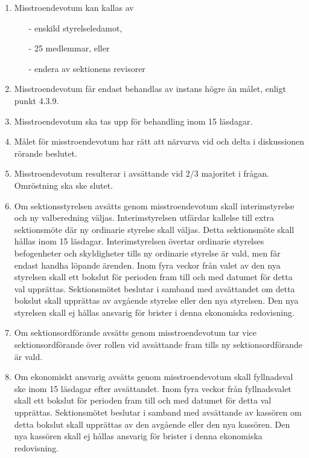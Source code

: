 \documentclass[11pt,a4paper]{article}
\begin{document}
\begin{enumerate}[\thesubsection .1]

   \item Misstroendevotum kan kallas av
		\begin{itemize}
			\item[-] enskild styrelseledamot, 
			\item[-] 25 medlemmar, eller
			\item[-] endera av sektionens revisorer
		\end{itemize}
	
	\item Misstroendevotum får endast behandlas av instans högre än målet, enligt punkt 4.3.9. %
	

	\item Misstroendevotum ska tas upp för behandling inom 15 läsdagar.

	\item Målet för misstroendevotum har rätt att närvarva vid och delta i diskussionen rörande beslutet.

	\item Misstroendevotum resulterar i avsättande vid 2/3 majoritet i frågan. Omröstning ska ske slutet. 

	\item Om sektionsstyrelsen avsätts genom misstroendevotum skall interimstyrelse och ny valberedning väljas. Interimstyrelsen utfärdar kallelse till extra sektionsmöte där ny ordinarie styrelse skall väljas. Detta sektionsmöte skall hållas inom 15 läsdagar. Interimstyrelsen övertar ordinarie styrelses befogenheter och skyldigheter tills ny ordinarie styrelse är vald, men får endast handha löpande ärenden. Inom fyra veckor från valet av den nya styrelsen skall ett bokslut för perioden fram till och med datumet för detta val upprättas. Sektionsmötet beslutar i samband med avsättandet om detta bokslut skall upprättas av avgående styrelse eller den nya styrelsen. Den nya styrelsen skall ej hållas ansvarig för brister i denna ekonomiska redovisning.

	\item Om sektionsordförande avsätts genom misstroendevotum tar vice sektionsordförande över rollen vid avsättande fram tills ny sektionsordförande är vald.

	\item Om ekonomiskt ansvarig avsätts genom misstroendevotum skall fyllnadsval ske inom 15 läsdagar efter avsättandet. Inom fyra veckor från fyllnadsvalet skall ett bokslut för perioden fram till och med datumet för detta val upprättas. Sektionsmötet beslutar i samband med avsättande av kassören om detta bokslut skall upprättas av den avgående eller den nya kassören. Den nya kassören skall ej hållas  ansvarig för brister i denna ekonomiska redovisning. 


\end{enumerate}
\end{document}

